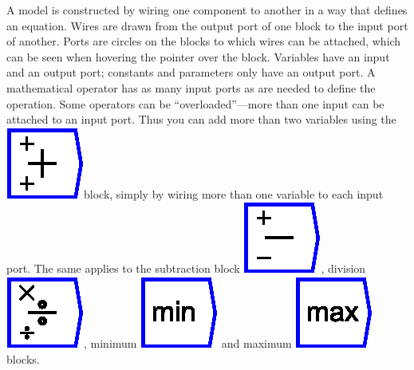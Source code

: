 A model is constructed by wiring one component to another in a way
that defines an equation. Wires are drawn from the output port of
one block to the input port of another. Ports are circles on the blocks
to which wires can be attached, which can be seen when hovering the
pointer over the block. Variables have an input and an output port;
constants and parameters only have an output port. A mathematical
operator has as many input ports as are needed to define the operation.
Some operators can be ``overloaded''---more than one input can
be attached to an input port. Thus you can add more than two variables
using the \includegraphics{images/add}block, simply by wiring more
than one variable to each input port. The same applies to the subtraction
block \includegraphics{images/minus}, division \includegraphics{images/Divide},
minimum \includegraphics{images/min} and maximum \includegraphics{images/max}
blocks.
